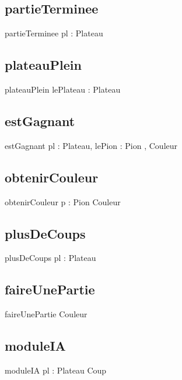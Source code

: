 	\subsection{partieTerminee}
		\begin{algorithme}
			\signaturefonction
				{partieTerminee}
				{pl : Plateau}
				{\booleen}
		\end{algorithme}
	\subsection{plateauPlein}
		\begin{algorithme}
			\signaturefonction
				{plateauPlein}
				{lePlateau : Plateau}
				{\booleen}
		\end{algorithme}
	\subsection{estGagnant}
		\begin{algorithme}
			\signaturefonction
				{estGagnant}
				{pl : Plateau, lePion : Pion}
				{\booleen, Couleur}
		\end{algorithme}
	\subsection{obtenirCouleur}
		\begin{algorithme}
			\signaturefonction
				{obtenirCouleur}
				{p : Pion}
				{Couleur}
		\end{algorithme}
	\subsection{plusDeCoups}
		\begin{algorithme}
			\signaturefonction
				{plusDeCoups}
				{pl : Plateau}
				{\booleen}
		\end{algorithme}
	\subsection{faireUnePartie}
\begin{algorithme}
	\signaturefonction
	{faireUnePartie}
	{}
	{Couleur}
\end{algorithme}
	\subsection{moduleIA}
\begin{algorithme}
	\signaturefonction
	{moduleIA}
	{pl : Plateau}
	{Coup}
\end{algorithme}
